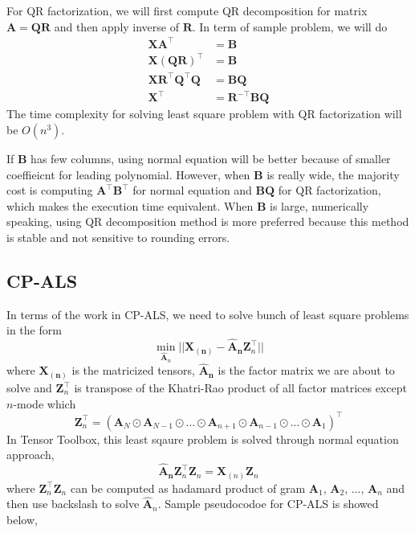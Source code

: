 \documentclass{article}
\newcommand{\mat}[1]{\mathbf{#1}}
\begin{document}
For QR factorization, we will first compute QR decomposition for matrix $\mat{A} = \mat{Q}\mat{R}$ and then apply inverse of $\mat{R}$. In term
of sample problem, we will do
\begin{align}
  \mat{X}\mat{A}^\top &= \mat{B} \nonumber \\
  \mat{X}(\mat{Q}\mat{R})^\top &= \mat{B} \nonumber \\
  \mat{X}\mat{R}^\top\mat{Q}^\top\mat{Q} &= \mat{B}\mat{Q} \nonumber \\
  \mat{X}^\top &= \mat{R}^{-\top}\mat{B}\mat{Q} \nonumber
\end{align} 
The time complexity for solving least square problem with QR factorization will be $O(n^3)$.


If $\mat{B}$ has few columns, using normal equation will be better because of smaller coeffieicnt
for leading polynomial. However, when $\mat{B}$ is really wide, the majority cost 
is computing $\mat{A}^\top\mat{B}^\top$ for normal equation and $\mat{B}\mat{Q}$ for QR factorization, 
which makes the execution time equivalent.
When $\mat{B}$ is large, numerically speaking, using QR decomposition method is more preferred because this method is stable
and not sensitive to rounding errors.







\subsection*{CP-ALS}
In terms of the work in CP-ALS, we need to solve bunch of least square problems in the form 
$$\min_{\mat{\hat{A}}_n}||\mat{X_{(n)}} - {\mat{\hat{A}_n}}\mat{Z}^\top_n ||$$
where $\mat{X_{(n)}}$ is the matricized tensors, $\mat{\hat{A}_n}$ is the factor matrix we are about to solve and 
$\mat{Z}^\top_n$ is transpose of the Khatri-Rao product of all factor matrices except $n$-mode which
$$\mat{Z}^\top_n = (\mat{A}_N \odot \mat{A}_{N-1} \odot \dots \odot \mat{A}_{n+1} \odot \mat{A}_{n-1} \odot \dots \odot \mat{A}_1)^\top $$ 
In Tensor Toolbox, this least sqaure problem is solved through normal equation approach,
$$\mat{\hat{A}_n}\mat{Z}_n^\top\mat{Z}_n = \mat{X}_{(n)}\mat{Z}_n$$
where $\mat{Z}_n^\top\mat{Z}_n$ can be computed as hadamard product of gram $\mat{A}_{1}$, $\mat{A}_{2}$, $\dots$, $\mat{A}_{n}$
and then use backslash to solve $\mat{\hat{A}}_n$. Sample pseudocodoe for CP-ALS is showed below,
\end{document}
